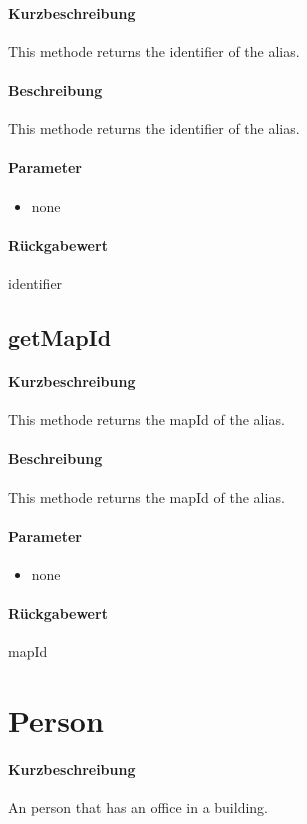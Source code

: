 \paragraph*{Kurzbeschreibung}
This methode returns the identifier of the alias.
\paragraph*{Beschreibung}
This methode returns the identifier of the alias.
\paragraph*{Parameter}
\begin{itemize}
    \item none
\end{itemize}
\paragraph*{Rückgabewert}
identifier

\subsection{getMapId}
\paragraph*{Kurzbeschreibung}
This methode returns the mapId of the alias.
\paragraph*{Beschreibung}
This methode returns the mapId of the alias.
\paragraph*{Parameter}
\begin{itemize}
    \item none
\end{itemize}
\paragraph*{Rückgabewert}
mapId

\section{Person}
\paragraph*{Kurzbeschreibung}
An person that has an office in a building.
